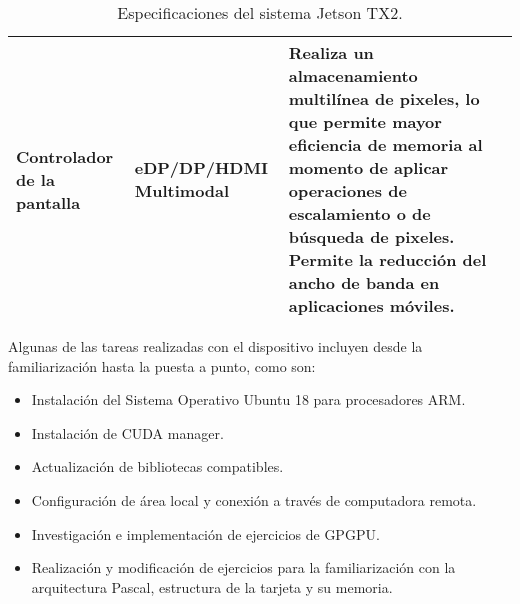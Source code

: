 \begin{table}[h!]
\begin{center}
\begin{tabular}{|m{3cm}|m{5.5cm}|m{6.5cm}|}
         \hline
   	 \textbf{Controlador de la pantalla} &eDP/DP/HDMI Multimodal & Realiza un almacenamiento multilínea de pixeles, lo que permite mayor eficiencia de memoria al momento de aplicar operaciones de escalamiento o de búsqueda de pixeles. Permite la reducción del ancho de banda en aplicaciones móviles.\\
         \hline
        \end{tabular}
        \caption{Especificaciones del sistema Jetson TX2\cite{jtx2dk}.}
        \label{tab:jetson}
      \end{center}
    \end{table}
       
   Algunas de las tareas realizadas con el dispositivo incluyen desde la familiarización hasta la puesta a punto, como son:
   \begin{itemize}
    \item Instalación del Sistema Operativo Ubuntu 18 para procesadores ARM.
     \item Instalación de CUDA manager.
     \item Actualización de bibliotecas compatibles.
     \item Configuración de área local y conexión a través de computadora remota.
      \item Investigación e implementación de ejercicios de GPGPU.
       \item Realización y modificación de ejercicios para la familiarización con la arquitectura Pascal, estructura de la tarjeta y su memoria.
    \end{itemize}   
   
